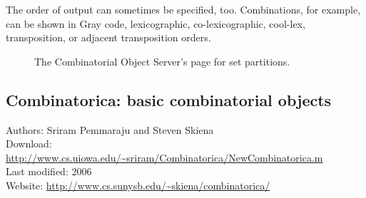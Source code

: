 \documentclass[12pt]{article}
\theoremstyle{plain}
\begin{document}
The order of output can sometimes be specified, too.
Combinations, for example, can be shown in Gray code, lexicographic, co-lexicographic, cool-lex, transposition, or adjacent transposition orders.

\begin{figure}
\setlength\fboxsep{0pt}
\setlength\fboxrule{0.5pt}
\centering  {}
\caption{The Combinatorial Object Server's page for set partitions. \label{fig:cos}}
\end{figure}

\subsection{Combinatorica: basic combinatorial objects}
\label{sec:combinatoricabasicobjects}
Authors: Sriram Pemmaraju and Steven Skiena
\\
Download: \url{http://www.cs.uiowa.edu/~sriram/Combinatorica/NewCombinatorica.m}
\\
Last modified: 2006
\\
Website: \url{http://www.cs.sunysb.edu/~skiena/combinatorica/}
\\
\end{document}
